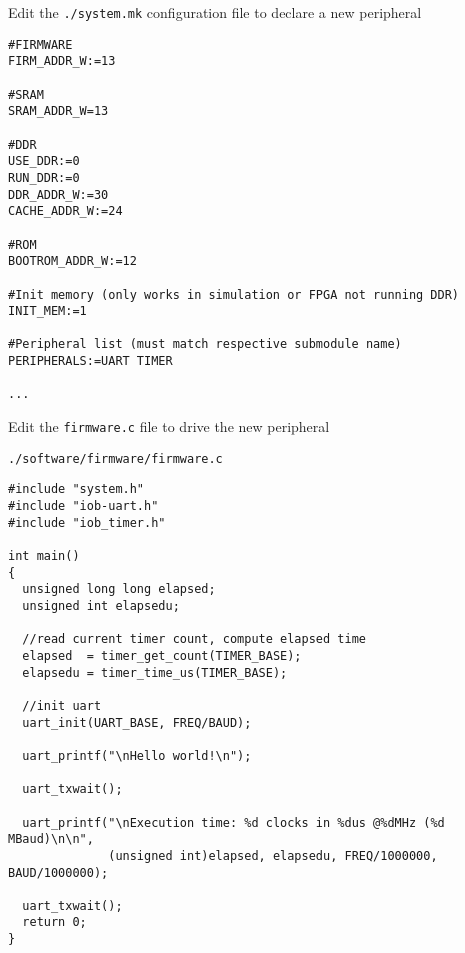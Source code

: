 \documentclass [xcolor=svgnames, t] {beamer}
\begin{document}
\begin{frame}[fragile]{Edit the {\tt ./system.mk} configuration file to declare a new peripheral}
\begin{tiny}
\begin{lstlisting}
#FIRMWARE
FIRM_ADDR_W:=13

#SRAM
SRAM_ADDR_W=13

#DDR
USE_DDR:=0
RUN_DDR:=0
DDR_ADDR_W:=30
CACHE_ADDR_W:=24

#ROM
BOOTROM_ADDR_W:=12

#Init memory (only works in simulation or FPGA not running DDR)
INIT_MEM:=1

#Peripheral list (must match respective submodule name)
PERIPHERALS:=UART TIMER

...
\end{lstlisting}
\end{tiny}
\end{frame}



\begin{frame}[fragile]{Edit the {\tt firmware.c} file to drive the new peripheral}

  {\tt ./software/firmware/firmware.c}
  \begin{tiny}
    \begin{lstlisting}
#include "system.h"
#include "iob-uart.h"
#include "iob_timer.h"

int main()
{
  unsigned long long elapsed;
  unsigned int elapsedu;

  //read current timer count, compute elapsed time
  elapsed  = timer_get_count(TIMER_BASE);
  elapsedu = timer_time_us(TIMER_BASE);

  //init uart 
  uart_init(UART_BASE, FREQ/BAUD);

  uart_printf("\nHello world!\n");
  
  uart_txwait();

  uart_printf("\nExecution time: %d clocks in %dus @%dMHz (%d MBaud)\n\n", 
              (unsigned int)elapsed, elapsedu, FREQ/1000000, BAUD/1000000);

  uart_txwait();
  return 0;
}
\end{lstlisting}
\end{tiny}
\end{frame}
\end{document}
